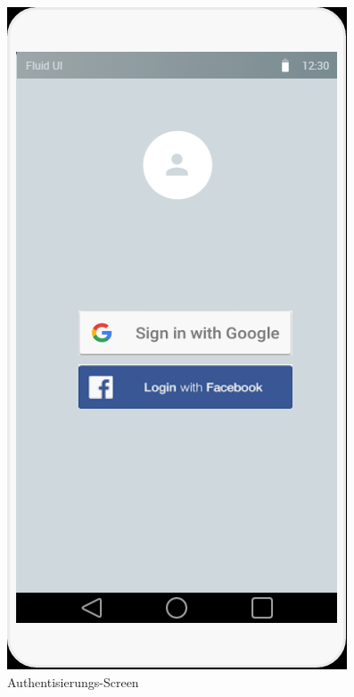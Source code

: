 \begin{figure}[H]
  \begin{minipage}[b]{0.4\textwidth}
    \includegraphics[width=\textwidth]{images/loginscreen_prototyp.PNG}
    \caption{Authentisierungs-Screen}
    \label{fig:loginscreen_2}
  \end{minipage}

\end{figure}
